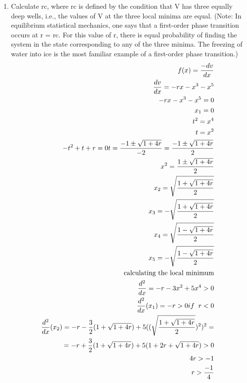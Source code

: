 \documentclass[a4paper,10pt]{article}
\begin{document}
\begin{enumerate}
    \newpage    
    \item Calculate rc, where rc is defined by the condition that V has three equally deep wells, i.e., the values of V at the three local minima are equal. (Note: In equilibrium statistical mechanics, one says that a first-order phase transition occurs at r = rc. For this value of r, there is equal probability of finding the system in the state corresponding to any of the three minima. The freezing of water into ice is the most familiar example of a first-order phase transition.) 
            \begin{equation}
                \begin{aligned}
                    f(x)= \frac{-dv}{dx}\\
                    \frac{dv}{dx}= -rx -x^{3}-x^{5}\\
                     -rx -x^{3}-x^{5}=0\\
                     x_{1}=0\\
                     t^{2}=x^{4}\\
                     t=x^{2}\\
                     -t^{2} + t +r=0
                     t=\frac{-1\pm \sqrt{1+ 4r}}{-2}= \frac{-1\pm\sqrt{1+ 4r}}{2}\\
                     x^{2}= \frac{1\pm\sqrt{1+4r}}{2}\\
                     x_{2}= \sqrt{\frac{1+\sqrt{1+4r}}{2}}\\
                     x_{3}= -\sqrt{\frac{1+\sqrt{1+4r}}{2}}\\
                     x_{4}=\sqrt{\frac{1-\sqrt{1+4r}}{2}}\\
                     x_{5}=-\sqrt{\frac{1-\sqrt{1+4r}}{2}}\\
                     \text{calculating the local minimum}\\
                     \frac{d^{2}}{dx}= -r -3x^{2}+5x^{4}>0\\
                     \frac{d^{2}}{dx}(x_{1})=-r>0 if \hspace{0.2cm}r<0\\
                     \frac{d^{2}}{dx}(x_{2})= -r -\frac{3}{2}(1+\sqrt{1+4r})+5((\sqrt{\frac{1+\sqrt{1+4r}}{2}})^{2})^{2}=\\
                     =-r +\frac{3}{2}(1+\sqrt{1+4r}) + 5(1+2r+\sqrt{1+4r})>0\\
                     4r>-1\\
                     r> \frac{-1}{4}\\

\end{aligned}
\end{equation}
\end{enumerate}
\end{document}
